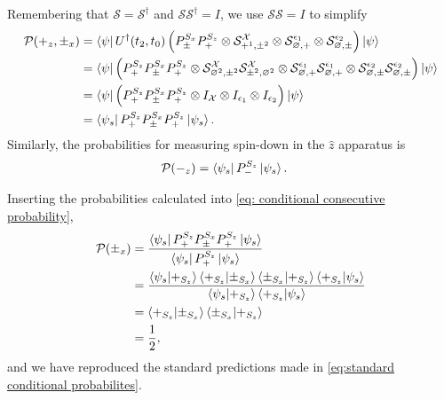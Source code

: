 Remembering that $\mathcal{S} = \mathcal{S}^\dagger$ and $\mathcal{S}\mathcal{S}^\dagger = I$, we use $\mathcal{S}\mathcal{S} = I$ to simplify
\begin{align}
  \mathcal{P}(+_z, \pm_x) &= \bra{\psi}  U^\dagger(t_2, t_0) \left(P^{S_x}_\pm P^{S_z}_+ \otimes \mathcal{S}^\mathcal{X}_{+^1, \pm^2 } \otimes \mathcal{S}^{\epsilon_1}_{\varnothing, +} \otimes \mathcal{S}^{\epsilon_2}_{\varnothing, \pm} \right) \ket{\psi} \\ \nonumber
  &= \bra{\psi} \left(P^{S_z}_+ P^{S_x}_\pm P^{S_z}_+ \otimes \mathcal{S}^\mathcal{X}_{\varnothing^2, \pm^2}\mathcal{S}^\mathcal{X}_{\pm^2, \varnothing^2} \otimes \mathcal{S}^{\epsilon_1}_{\varnothing, +} \mathcal{S}^{\epsilon_1}_{ \varnothing, +} \otimes \mathcal{S}^{\epsilon_2}_{\varnothing, \pm} \mathcal{S}^{\epsilon_2}_{\varnothing, \pm} \right) \ket{\psi} \\ \nonumber
  &= \bra{\psi} \left(P^{S_z}_+ P^{S_x}_\pm P^{S_z}_+ \otimes I_\mathcal{X}  \otimes I_{\epsilon_1} \otimes I_{\epsilon_2} \right) \ket{\psi} \\ \nonumber
  &= \bra{\psi_s} P^{S_z}_+ P^{S_x}_\pm P^{S_z}_+ \ket{\psi_s}.
\end{align}
Similarly, the probabilities for measuring spin-down in the $\hat{z}$ apparatus is
\begin{align}
  \mathcal{P}(-_z) &= \bra{\psi_s} P^{S_z}_- \ket{\psi_s}.
\end{align}

Inserting the probabilities calculated into \autoref{eq: conditional consecutive probability},
\begin{align}
    \mathcal{P}(\pm_x) &= \frac{\bra{\psi_s} P^{S_z}_+ P^{S_x}_\pm P^{S_z}_+ \ket{\psi_s}}{\bra{\psi_s} P^{S_z}_+ \ket{\psi_s}} \\ \nonumber
    &= \frac{\braket{\psi_s | +_{S_z}} \braket{+_{S_z}|\pm_{S_x}} \braket{\pm_{S_x}|+_{S_z}} \braket{+_{S_z}|\psi_s}}{\braket{\psi_s | +_{S_z}} \braket{+_{S_z}|\psi_s}} \\ \nonumber
    &= \braket{+_{S_z}|\pm_{S_x}} \braket{\pm_{S_x}|+_{S_z}} \\ \nonumber
    &= \frac{1}{2},
\end{align}
and we have reproduced the standard predictions made in \autoref{eq:standard conditional probabilites}.


